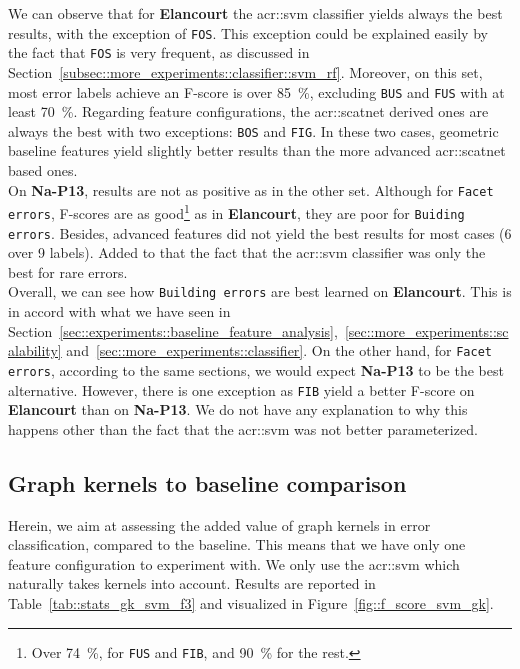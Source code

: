             We can observe that for \textbf{Elancourt} the \gls{acr::svm} classifier yields always the best results, with the exception of \texttt{FOS}.
            This exception could be explained easily by the fact that \texttt{FOS} is very frequent, as discussed in Section~\ref{subsec::more_experiments::classifier::svm_rf}.
            Moreover, on this set, most error labels achieve an F-score is over \SI{85}{\percent}, excluding \texttt{BUS} and \texttt{FUS} with at least \SI{70}{\percent}.
            Regarding feature configurations, the \gls{acr::scatnet} derived ones are always the best with two exceptions: \texttt{BOS} and \texttt{FIG}.
            In these two cases, geometric baseline features yield slightly better results than the more advanced \gls{acr::scatnet} based ones.\\

            On \textbf{Na-P13}, results are not as positive as in the other set.
            Although for \texttt{Facet errors}, F-scores are as good\footnote{
                Over \SI{74}{\percent}, for \texttt{FUS} and \texttt{FIB}, and \SI{90}{\percent} for the rest.
            } as in \textbf{Elancourt}, they are poor for \texttt{Buiding errors}.
            Besides, advanced features did not yield the best results for most cases (6 over 9 labels).
            Added to that the fact that the \gls{acr::svm} classifier was only the best for rare errors.\\

            Overall, we can see how \texttt{Building errors} are best learned on \textbf{Elancourt}.
            This is in accord with what we have seen in Section~\ref{sec::experiments::baseline_feature_analysis},~\ref{sec::more_experiments::scalability} and~\ref{sec::more_experiments::classifier}.
            On the other hand, for \texttt{Facet errors}, according to the same sections, we would expect \textbf{Na-P13} to be the best alternative.
            However, there is one exception as \texttt{FIB} yield a better F-score on \textbf{Elancourt} than on \textbf{Na-P13}.
            We do not have any explanation to why this happens other than the fact that the \gls{acr::svm} was not better parameterized.

    \subsection{Graph kernels to baseline comparison}
        \label{subsec::more_experiments::richer_features::graph_kernel_baseline}
        Herein, we aim at assessing the added value of graph kernels in error classification, compared to the baseline.
        This means that we have only one feature configuration to experiment with.
        We only use the \gls{acr::svm} which naturally takes kernels into account.
        Results are reported in Table~\ref{tab::stats_gk_svm_f3} and visualized in Figure~\ref{fig::f_score_svm_gk}.\\

